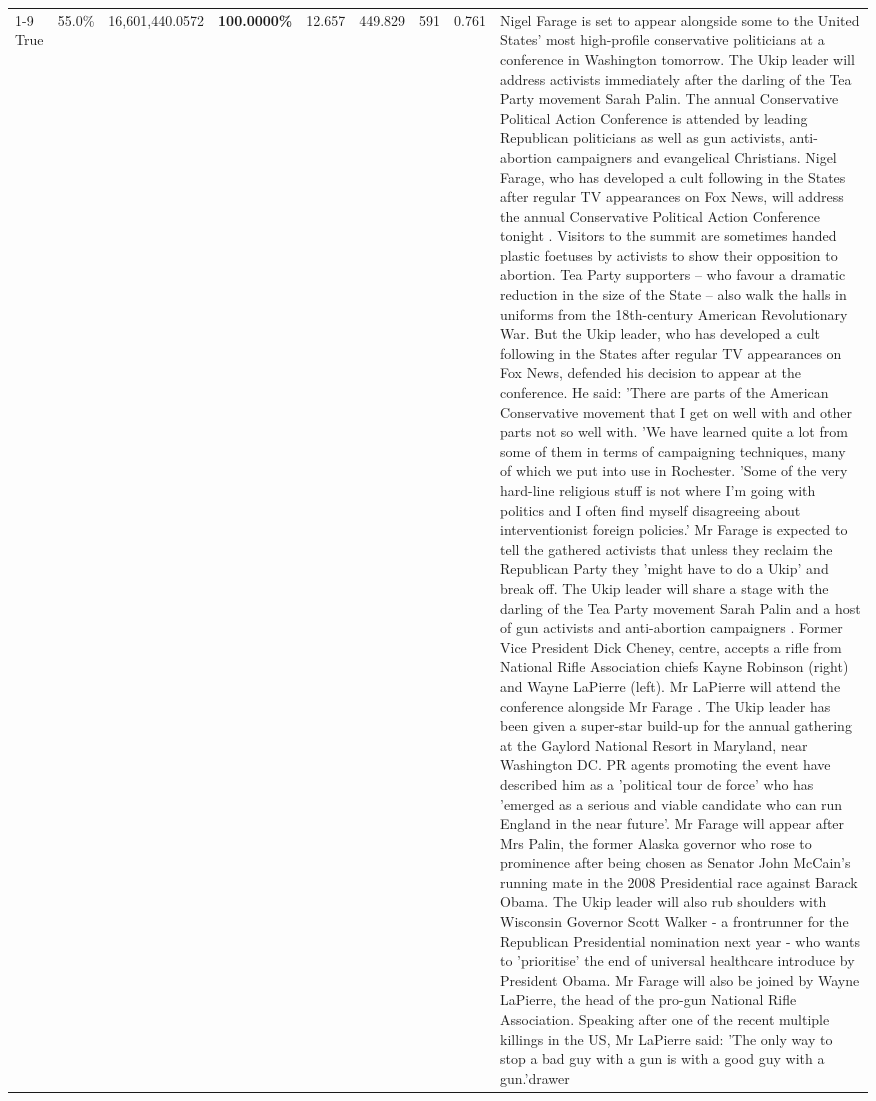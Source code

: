 \begin{table}[H]
\begin{tabular}{lllrlllll}
\cline{1-9}
True & 55.0\% & 16,601,440.0572 & \bfseries \color{red} 100.0000\% & 12.657 & 449.829 & 591 & 0.761 & Nigel Farage is set to appear alongside some to the United States' most high-profile conservative politicians at a conference in Washington tomorrow. The Ukip leader will address activists immediately after the darling of the Tea Party movement Sarah Palin. The annual Conservative Political Action Conference is attended by leading Republican politicians as well as gun activists, anti-abortion campaigners and evangelical Christians. Nigel Farage, who has developed a cult following in the States after regular TV appearances on Fox News, will address the annual Conservative Political Action Conference tonight . Visitors to the summit are sometimes handed plastic foetuses by activists to show their opposition to abortion. Tea Party supporters – who favour a dramatic reduction in the size of the State – also walk the halls in uniforms from the 18th-century American Revolutionary War. But the Ukip leader, who has developed a cult following in the States after regular TV appearances on Fox News, defended his decision to appear at the conference. He said: 'There are parts of the American Conservative movement that I get on well with and other parts not so well with. 'We have learned quite a lot from some of them in terms of campaigning techniques, many of which we put into use in Rochester. 'Some of the very hard-line religious stuff is not where I'm going with politics and I often find myself disagreeing about interventionist foreign policies.' Mr Farage is expected to tell the gathered activists that unless they reclaim the Republican Party they 'might have to do a Ukip' and break off. The Ukip leader will share a stage with the darling of the Tea Party movement Sarah Palin and a host of gun activists and anti-abortion campaigners . Former Vice President Dick Cheney, centre, accepts a rifle from National Rifle Association chiefs Kayne Robinson (right) and Wayne LaPierre (left). Mr LaPierre will attend the conference alongside Mr Farage . The Ukip leader has been given a super-star build-up for the annual gathering at the Gaylord National Resort in Maryland, near Washington DC. PR agents promoting the event have described him as a 'political tour de force' who has 'emerged as a serious and viable candidate who can run England in the near future'. Mr Farage will appear after Mrs Palin, the former Alaska governor who rose to prominence after being chosen as Senator John McCain's running mate in the 2008 Presidential race against Barack Obama. The Ukip leader will also rub shoulders with Wisconsin Governor Scott Walker - a frontrunner for the Republican Presidential nomination next year - who wants to 'prioritise' the end of universal healthcare introduce by President Obama. Mr Farage will also be joined by Wayne LaPierre, the head of the pro-gun National Rifle Association. Speaking after one of the recent multiple killings in the US, Mr LaPierre said: 'The only way to stop a bad guy with a gun is with a good guy with a gun.'drawer \\

\end{tabular}
\end{table}
